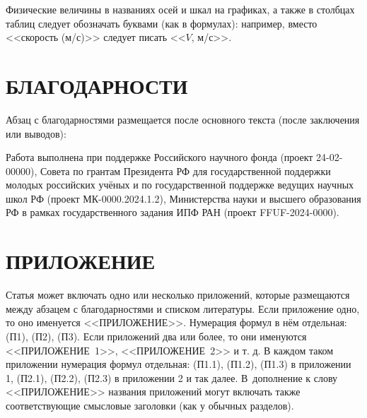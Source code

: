 \documentclass[12pt, a4paper]{article}
\begin{document}
Физические величины в названиях осей и шкал на графиках, а также в столбцах таблиц следует обозначать буквами (как в формулах): например, вместо <<скорость (м/с)>> следует писать <<$V$, м/с>>.

\section{БЛАГОДАРНОСТИ}

Абзац с благодарностями размещается после основного текста (после заключения или выводов):

Работа выполнена при поддержке Российского научного фонда (проект 24-02-00000), Совета по грантам Президента РФ для государственной поддержки молодых российских учёных и по государственной поддержке ведущих научных школ РФ (проект МК-0000.2024.1.2), Министерства науки и высшего образования РФ в рамках государственного задания ИПФ РАН (проект FFUF-2024-0000).

\section*{\hfill ПРИЛОЖЕНИЕ}

Статья может включать одно или несколько приложений, которые размещаются между абзацем с благодарностями и списком литературы. Если приложение одно, то оно именуется <<ПРИЛОЖЕНИЕ>>. Нумерация формул в нём отдельная: (П1), (П2), (П3). Если приложений два или более, то они именуются <<ПРИЛОЖЕНИЕ~1>>, <<ПРИЛОЖЕНИЕ~2>> и т. д. В каждом таком приложении нумерация формул отдельная: (П1.1), (П1.2), (П1.3) в приложении 1, (П2.1), (П2.2), (П2.3) в приложении 2 и так далее. В~дополнение к слову <<ПРИЛОЖЕНИЕ>> названия приложений могут включать также соответствующие смысловые заголовки (как у обычных разделов).
\end{document}
